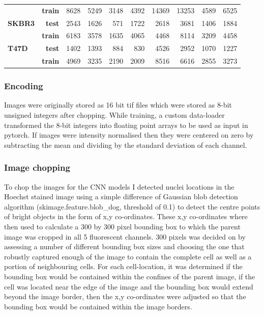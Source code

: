 \documentclass[a4paper,11pt,twoside,openright]{scrbook}
\begin{document}
\begin{table}[h]
\begin{tabular}{lrrrrrrrrr}
        & \textbf{train} &   8628 &   5249 &         3148 &   4392 &       14369 &       13253 &          4589 &   6525 \\
\textbf{SKBR3} & \textbf{test} &   2543 &   1626 &          571 &   1722 &        2618 &        3681 &          1406 &   1884 \\
        & \textbf{train} &   6183 &   3578 &         1635 &   4065 &        4468 &        8114 &          3209 &   4458 \\
\textbf{T47D} & \textbf{test} &   1402 &   1393 &          884 &    830 &        4526 &        2952 &          1070 &   1227 \\
        & \textbf{train} &   4969 &   3235 &         2190 &   2009 &        8516 &        6616 &          2855 &   3273 \\
\bottomrule
\end{tabular}
\end{table}

\subsubsection{Encoding}
Images were originally stored as 16 bit tif files which were stored as 8-bit unsigned integers after chopping.
While training, a custom data-loader transformed the 8-bit integers into floating point arrays to be used as input in pytorch.
If images were intensity normalised then they were centered on zero by subtracting the mean and dividing by the standard deviation of each channel.

\subsubsection{Image chopping}
To chop the images for the CNN models I detected nuclei locations in the Hoechst stained image using a simple difference of Gaussian blob detection algorithm (skimage.feature.blob\_dog, threshold of 0.1) to detect the centre points of bright objects in the form of x,y co-ordinates.
These x,y co-ordinates where then used to calculate a 300 by 300 pixel bounding box to which the parent image was cropped in all 5 fluorescent channels.
300 pixels was decided on by assessing a number of different bounding box sizes and choosing the one that robustly captured enough of the image to contain the complete cell as well as a portion of neighbouring cells.
For each cell-location, it was determined if the bounding box would be contained within the confines of the parent image, if the cell was located near the edge of the image and the bounding box would extend beyond the image border, then the x,y co-ordinates were adjusted so that the bounding box would be contained within the image borders.
\end{document}
